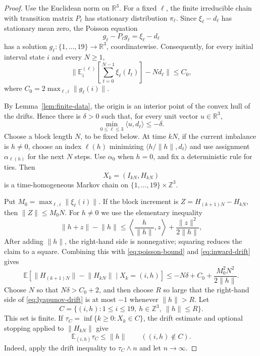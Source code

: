 \documentclass[11pt,a4paper]{amsart}
\newcommand{\R}{\mathbb R}
\newcommand{\Z}{\mathbb Z}
\newcommand{\Ee}{\mathbb E}
\newcommand{\norm}[1]{\lVert #1\rVert}
\begin{document}
\begin{proof}
Use the Euclidean norm on $\R^3$. For a fixed $\ell$, the finite irreducible chain with transition matrix $P_\ell$ has stationary distribution $\pi_\ell$. Since $\xi_\ell-d_\ell$ has stationary mean zero, the Poisson equation
\[
 g_\ell-P_\ell g_\ell=\xi_\ell-d_\ell
\]
has a solution $g_\ell:\{1,\ldots,19\}\to\R^3$, coordinatewise. Consequently, for every initial interval state $i$ and every $N\ge1$,
\begin{equation}\label{eq:poisson-bound}
 \norm{\Ee_i^{(\ell)}\!\left[\sum_{t=0}^{N-1}\xi_\ell(I_t)\right]-Nd_\ell}
 \le C_0,
\end{equation}
where $C_0=2\max_{\ell,i}\norm{g_\ell(i)}$.

By Lemma~\ref{lem:finite-data}, the origin is an interior point of the convex hull of the drifts. Hence there is $\delta>0$ such that, for every unit vector $u\in\R^3$,
\begin{equation}\label{eq:inward-drift}
 \min_{0\le\ell\le3}\langle u,d_\ell\rangle\le-\delta.
\end{equation}
Choose a block length $N$, to be fixed below. At time $kN$, if the current imbalance is $h\ne0$, choose an index $\ell(h)$ minimizing $\langle h/\norm{h},d_\ell\rangle$ and use assignment $\alpha_{\ell(h)}$ for the next $N$ steps. Use $\alpha_0$ when $h=0$, and fix a deterministic rule for ties. Then
\[
 X_k=(I_{kN},H_{kN})
\]
is a time-homogeneous Markov chain on $\{1,\ldots,19\}\times\Z^3$.

Put $M_0=\max_{\ell,i}\norm{\xi_\ell(i)}$. If the block increment is $Z=H_{(k+1)N}-H_{kN}$, then $\norm{Z}\le M_0N$. For $h\ne0$ we use the elementary inequality
\[
 \norm{h+z}-\norm{h}
 \le \left\langle\frac{h}{\norm{h}},z\right\rangle
     +\frac{\norm{z}^2}{2\norm{h}},
\]
After adding $\norm{h}$, the right-hand side is nonnegative; squaring reduces the claim to a square. Combining this with \eqref{eq:poisson-bound} and \eqref{eq:inward-drift} gives
\begin{equation}\label{eq:lyapunov-drift}
 \Ee\!\left[\norm{H_{(k+1)N}}-\norm{H_{kN}}\mid X_k=(i,h)\right]
 \le -N\delta+C_0+\frac{M_0^2N^2}{2\norm{h}}.
\end{equation}
Choose $N$ so that $N\delta>C_0+2$, and then choose $R$ so large that the right-hand side of \eqref{eq:lyapunov-drift} is at most $-1$ whenever $\norm{h}>R$. Let
\[
 C=\{(i,h):1\le i\le19,\ h\in\Z^3,\ \norm{h}\le R\}.
\]
This set is finite. If $\tau_C=\inf\{k\ge0:X_k\in C\}$, the drift estimate and optional stopping applied to $\norm{H_{kN}}$ give
\begin{equation}\label{eq:hitting-bound}
 \Ee_{(i,h)}\tau_C\le\norm{h}
 \qquad((i,h)\notin C).
\end{equation}
Indeed, apply the drift inequality to $\tau_C\wedge n$ and let $n\to\infty$.


\end{proof}
\end{document}
